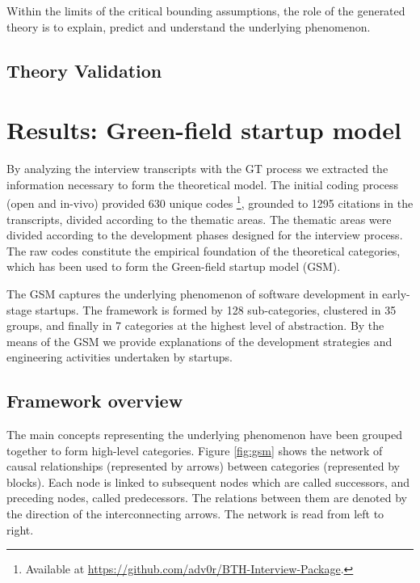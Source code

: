 \documentclass[10pt,journal,letterpaper,compsoc]{IEEEtran}
\begin{document}
Within the limits of the critical bounding assumptions, the role of the generated theory is to explain, predict and understand the underlying phenomenon.

\subsection{Theory Validation}


\section{Results: Green-field startup model}
\label{res:gsm}

By analyzing the interview transcripts with the GT process we extracted the information necessary to form the theoretical model. The initial coding process (open and in-vivo) provided 630 unique codes \footnote{Available at \url{https://github.com/adv0r/BTH-Interview-Package}.}, grounded to 1295 citations in the transcripts, divided according to the thematic areas. The thematic areas were divided according to the development phases designed for the interview process. The raw codes constitute the empirical foundation of the theoretical categories, which has been used to form the Green-field startup model (GSM).

The GSM captures the underlying phenomenon of software development in early-stage startups. The framework is formed by 128 sub-categories, clustered in 35 groups, and finally in 7 categories at the highest level of abstraction. By the means of the GSM we provide explanations of the development strategies and engineering activities undertaken by startups.
\subsection{Framework overview}
\label{res:gsm:frmov}
The main concepts representing the underlying phenomenon have been grouped together to form high-level categories. Figure \ref{fig:gsm} shows the network of causal relationships (represented by arrows) between categories (represented by blocks). Each node is linked to subsequent nodes which are called successors, and preceding nodes, called predecessors. The relations between them are denoted by the direction of the interconnecting arrows. The network is read from left to right.
\end{document}

